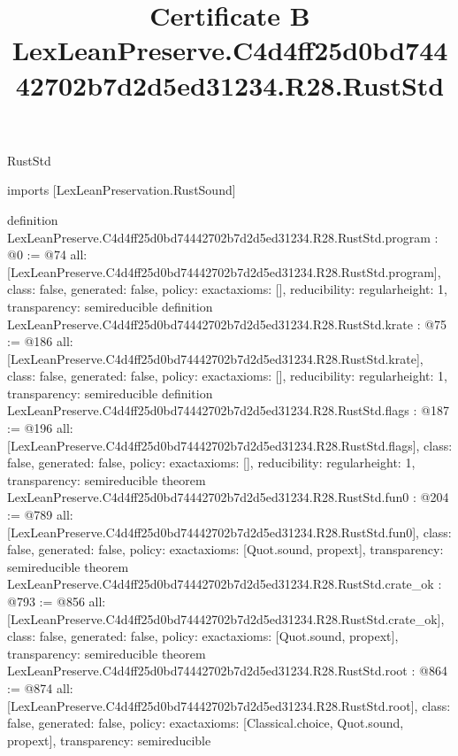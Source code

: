 \begin{lexlean}{RustStd}
\title{Certificate B LexLeanPreserve.C4d4ff25d0bd74442702b7d2d5ed31234.R28.RustStd}
\begin{coremodule}
imports [LexLeanPreservation.RustSound]

definition LexLeanPreserve.C4d4ff25d0bd74442702b7d2d5ed31234.R28.RustStd.program : @0 := @74 {
  all: [LexLeanPreserve.C4d4ff25d0bd74442702b7d2d5ed31234.R28.RustStd.program],
  class: false,
  generated: false,
  policy: exact{axioms: []},
  reducibility: regular{height: 1},
  transparency: semireducible
}
definition LexLeanPreserve.C4d4ff25d0bd74442702b7d2d5ed31234.R28.RustStd.krate : @75 := @186 {
  all: [LexLeanPreserve.C4d4ff25d0bd74442702b7d2d5ed31234.R28.RustStd.krate],
  class: false,
  generated: false,
  policy: exact{axioms: []},
  reducibility: regular{height: 1},
  transparency: semireducible
}
definition LexLeanPreserve.C4d4ff25d0bd74442702b7d2d5ed31234.R28.RustStd.flags : @187 := @196 {
  all: [LexLeanPreserve.C4d4ff25d0bd74442702b7d2d5ed31234.R28.RustStd.flags],
  class: false,
  generated: false,
  policy: exact{axioms: []},
  reducibility: regular{height: 1},
  transparency: semireducible
}
theorem LexLeanPreserve.C4d4ff25d0bd74442702b7d2d5ed31234.R28.RustStd.fun0 : @204 := @789 {
  all: [LexLeanPreserve.C4d4ff25d0bd74442702b7d2d5ed31234.R28.RustStd.fun0],
  class: false,
  generated: false,
  policy: exact{axioms: [Quot.sound, propext]},
  transparency: semireducible
}
theorem LexLeanPreserve.C4d4ff25d0bd74442702b7d2d5ed31234.R28.RustStd.crate_ok : @793 := @856 {
  all: [LexLeanPreserve.C4d4ff25d0bd74442702b7d2d5ed31234.R28.RustStd.crate_ok],
  class: false,
  generated: false,
  policy: exact{axioms: [Quot.sound, propext]},
  transparency: semireducible
}
theorem LexLeanPreserve.C4d4ff25d0bd74442702b7d2d5ed31234.R28.RustStd.root : @864 := @874 {
  all: [LexLeanPreserve.C4d4ff25d0bd74442702b7d2d5ed31234.R28.RustStd.root],
  class: false,
  generated: false,
  policy: exact{axioms: [Classical.choice, Quot.sound, propext]},
  transparency: semireducible
}


\end{coremodule}
\end{lexlean}
